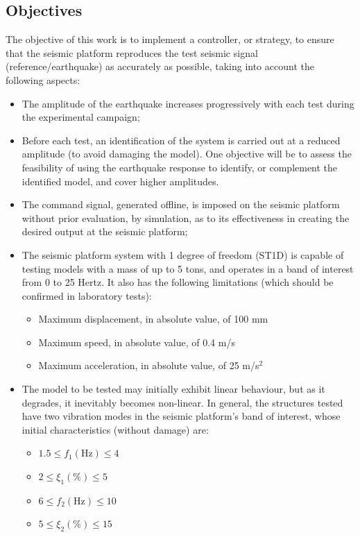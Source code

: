 \documentclass[9pt]{extarticle}
\begin{document}
\clearpage


\subsection{Objectives}
The objective of this work is to implement a controller, or strategy, to ensure that the seismic platform reproduces the test seismic signal (reference/earthquake) as accurately as possible, taking into account the following aspects:
\begin{itemize}
    \item The amplitude of the earthquake increases progressively with each test during the experimental campaign;
    \item Before each test, an identification of the system is carried out at a reduced amplitude (to avoid damaging the model). One objective will be to assess the feasibility of using the earthquake response to identify, or complement the identified model, and cover higher amplitudes.
    \item The command signal, generated offline, is imposed on the seismic platform without prior evaluation, by simulation, as to its effectiveness in creating the desired output at the seismic platform;
    \item The seismic platform system with 1 degree of freedom (ST1D) is capable of testing models with a mass of up to 5 tons, and operates in a band of interest from 0 to 25 Hertz. It also has the following limitations (which should be confirmed in laboratory tests):
    \begin{itemize}
        \item Maximum displacement, in absolute value, of 100 mm
        \item Maximum speed, in absolute value, of 0.4 m/s
        \item Maximum acceleration, in absolute value, of 25 m/s$^2$
    \end{itemize}
    \item The model to be tested may initially exhibit linear behaviour, but as it degrades, it inevitably becomes non-linear. In general, the structures tested have two vibration modes in the seismic platform's band of interest, whose initial characteristics (without damage) are:
    \begin{itemize}[label=$\diamond$]
    \item $1.5 \leq f_1 (\mathrm{Hz}) \leq 4$
    \item $2 \leq \xi_1 (\%) \leq 5$
    \item $6 \leq f_2 (\mathrm{Hz}) \leq 10$
    \item $5 \leq \xi_2 (\%) \leq 15$
    

\end{itemize}
\end{itemize}
\end{document}
